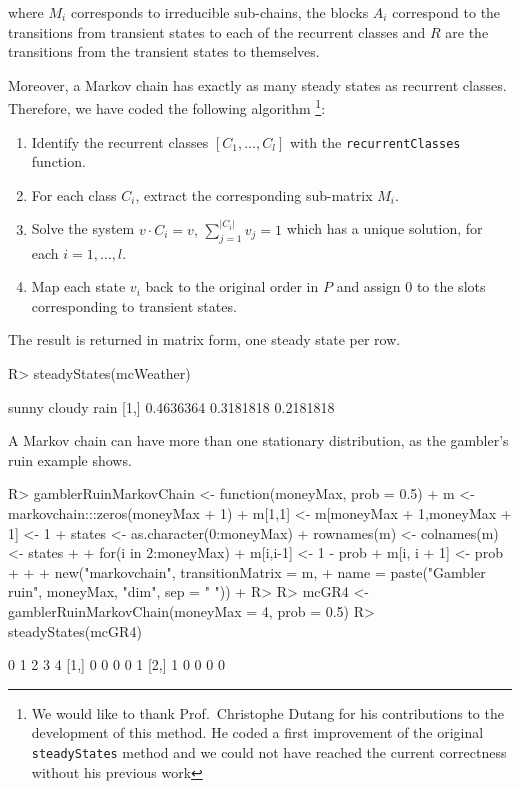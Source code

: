 \documentclass[
  nojss]{jss}
\providecommand{\tightlist}{%
  \setlength{\itemsep}{0pt}\setlength{\parskip}{0pt}}
\begin{document}
where \(M_i\) corresponds to irreducible sub-chains, the blocks \(A_i\) correspond to the transitions from transient states to each of the recurrent classes and \(R\) are the transitions from the transient states to themselves.

Moreover, a Markov chain has exactly as many steady states as recurrent classes. Therefore, we have coded the following algorithm \footnote{We would like to thank Prof.~Christophe Dutang for his contributions to the development of this method. He coded a first improvement of the original \texttt{steadyStates} method and we could not have reached the current correctness without his previous work}:

\begin{enumerate}
\def\labelenumi{\arabic{enumi}.}
\tightlist
\item
  Identify the recurrent classes \([C_1, \ldots, C_l]\) with the \texttt{recurrentClasses} function.
\item
  For each class \(C_i\), extract the corresponding sub-matrix \(M_i\).
\item
  Solve the system \(v \cdot C_i = v, \, \sum_{j = 1}^{|C_i|} v_j = 1\) which has a unique solution, for each \(i = 1, \ldots, l\).
\item
  Map each state \(v_i\) back to the original order in \(P\) and assign \(0\) to the slots corresponding to transient states.
\end{enumerate}

The result is returned in matrix form, one steady state per row.

\begin{CodeChunk}
\begin{CodeInput}
R> steadyStates(mcWeather)
\end{CodeInput}
\begin{CodeOutput}
         sunny    cloudy      rain
[1,] 0.4636364 0.3181818 0.2181818
\end{CodeOutput}
\end{CodeChunk}

A Markov chain can have more than one stationary distribution, as the gambler's ruin example shows.

\begin{CodeChunk}
\begin{CodeInput}
R> gamblerRuinMarkovChain <- function(moneyMax, prob = 0.5) {
+   m <- markovchain:::zeros(moneyMax + 1)
+   m[1,1] <- m[moneyMax + 1,moneyMax + 1] <- 1
+   states <- as.character(0:moneyMax)
+   rownames(m) <- colnames(m) <- states
+   
+   for(i in 2:moneyMax){ 
+     m[i,i-1] <- 1 - prob
+     m[i, i + 1] <- prob   
+   }
+   
+   new("markovchain", transitionMatrix = m, 
+       name = paste("Gambler ruin", moneyMax, "dim", sep = " "))
+ }
R> 
R> mcGR4 <- gamblerRuinMarkovChain(moneyMax = 4, prob = 0.5)
R> steadyStates(mcGR4)
\end{CodeInput}
\begin{CodeOutput}
     0 1 2 3 4
[1,] 0 0 0 0 1
[2,] 1 0 0 0 0
\end{CodeOutput}
\end{CodeChunk}
\end{document}

